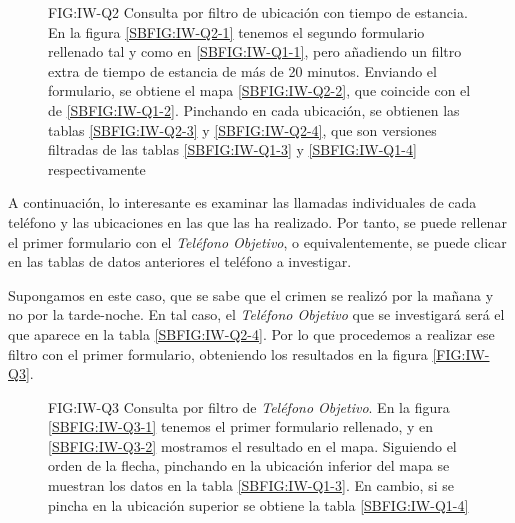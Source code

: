     \begin{figure}[Consulta por filtro de ubicación con tiempo de estancia]{FIG:IW-Q2}
      {Consulta por filtro de ubicación con tiempo de estancia. En la figura \ref{SBFIG:IW-Q2-1} tenemos el segundo formulario rellenado tal y como en \ref{SBFIG:IW-Q1-1}, pero añadiendo un filtro extra de tiempo de estancia de más de 20 minutos. Enviando el formulario, se obtiene el mapa \ref{SBFIG:IW-Q2-2}, que coincide con el de \ref{SBFIG:IW-Q1-2}. Pinchando en cada ubicación, se obtienen las tablas \ref{SBFIG:IW-Q2-3} y \ref{SBFIG:IW-Q2-4}, que son versiones filtradas de las tablas \ref{SBFIG:IW-Q1-3} y \ref{SBFIG:IW-Q1-4} respectivamente}
      \quad
      \quad
      \quad
    \end{figure}
    
    A continuación, lo interesante es examinar las llamadas individuales de cada teléfono y las ubicaciones en las que las ha realizado. Por tanto, se puede rellenar el primer formulario con el \textit{Teléfono Objetivo}, o equivalentemente, se puede clicar en las tablas de datos anteriores el teléfono a investigar.
    
    Supongamos en este caso, que se sabe que el crimen se realizó por la mañana y no por la tarde-noche. En tal caso, el \textit{Teléfono Objetivo} que se investigará será el que aparece en la tabla \ref{SBFIG:IW-Q2-4}. Por lo que procedemos a realizar ese filtro con el primer formulario, obteniendo los resultados en la figura \ref{FIG:IW-Q3}. 
    
    \begin{figure}[Consulta por filtro de \textit{Teléfono Objetivo}]{FIG:IW-Q3}
      {Consulta por filtro de \textit{Teléfono Objetivo}. En la figura \ref{SBFIG:IW-Q3-1} tenemos el primer formulario rellenado, y en \ref{SBFIG:IW-Q3-2} mostramos el resultado en el mapa. Siguiendo el orden de la flecha, pinchando en la ubicación inferior del mapa se muestran los datos en la tabla \ref{SBFIG:IW-Q1-3}. En cambio, si se pincha en la ubicación superior se obtiene la tabla \ref{SBFIG:IW-Q1-4}}
      \quad
      \quad
      \quad
    \end{figure}
  
